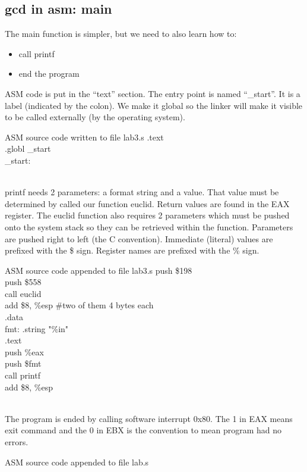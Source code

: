 \documentclass{article}
\begin{document}
\clearpage\subsection{gcd in asm: main}
%
The main function is simpler, but we need to also learn how to: 
\begin{itemize}
\item call printf
\item end the program
\end{itemize}
ASM code is put in the ``text'' section. The entry point is named ``_start''. It is a label (indicated by the colon). We make it global so the linker will make it visible to be called externally (by the operating system).
\begin{GFT}{ASM source code written to file lab3.s}
\+.text\\
\+.globl \_start\\
\+\_start:\\
\+\\
\end{GFT}
\clearpage
printf needs 2 parameters: a format string and a value. That value must be determined by called our function euclid. Return values are found in the EAX register. The euclid function also requires 2 parameters which must be pushed onto the system stack so they can be retrieved within the function. Parameters are pushed right to left (the C convention). Immediate (literal) values are prefixed with the \$ sign. Register names are prefixed with the \% sign.
\begin{GFT}{ASM source code appended to file lab3.s}
\+push \$198\\
\+push \$558\\
\+call euclid\\
\+add \$8, \%esp \#two of them 4 bytes each\\
\+.data\\
\+fmt: .string "\%i\Backslash{}n"\\
\+.text\\
\+push \%eax\\
\+push \$fmt\\
\+call printf\\
\+add \$8, \%esp\\
\+\\
\end{GFT}
\clearpage
The program is ended by calling software interrupt 0x80. The 1 in EAX means exit command and the 0 in EBX is the convention to mean program had no errors.
\begin{GFT}{ASM source code appended to file lab.s}
\end{GFT}
\end{document}
